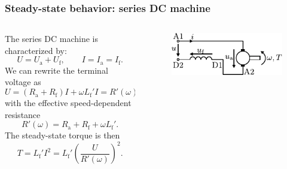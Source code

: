 \begin{frame}
	\frametitle{Steady-state behavior: series DC machine}
	\begin{columns}
		\begin{column}{0.55\textwidth}
		The series DC machine is characterized by:
	   \begin{equation}
		U = U_\mathrm{a} + U_\mathrm{f}, \qquad I = I_\mathrm{a} = I_\mathrm{f}.
		\label{eq:DC_series_machine_char}
	   \end{equation}
	   We can rewrite the terminal voltage as
	   \begin{equation}
		U = \left(R_\mathrm{a} + R_\mathrm{f}\right) I + \omega L_\mathrm{f}' I = R'(\omega) I 
	   \end{equation}
	   with the effective speed-dependent resistance
	   \begin{equation}
		R'(\omega) = R_\mathrm{a} + R_\mathrm{f} + \omega L_\mathrm{f}'.
	   \end{equation}
	   The steady-state torque is then
	   \begin{equation}
		T = L_\mathrm{f}' I^2 = L_\mathrm{f}'\left(\frac{U}{R'(\omega)}\right)^2.
		\label{eq:Torque_series_DC_machine}
	   \end{equation}
\end{column}
\hfill
\begin{column}{0.45\textwidth}
	\begin{figure}
		\centering
		\includegraphics[scale=1.25]{fig/lec03/Series_DC_machine.pdf}
	\end{figure}
\end{column}
\end{columns}
\end{frame}

